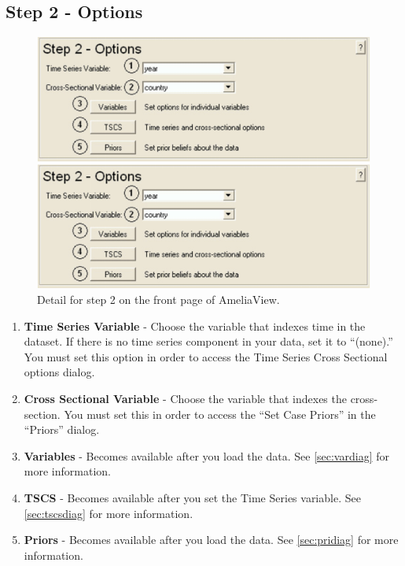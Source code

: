 \documentclass[12pt,titlepage]{article}
\begin{document}
\subsection{Step 2 - Options}

\label{sec:step2}
\begin{figure}[ht]
 \begin{htmlonly} 
  \centering \includegraphics[scale=1]{step2} 
 \end{htmlonly}
 \begin{latexonly}
  \centering \includegraphics[scale=.75]{step2}
 \end{latexonly}
  \caption{Detail for step 2 on the front page of AmeliaView.}
\end{figure}
\begin{enumerate}
\item \textbf{Time Series Variable} - Choose the variable that indexes
  time in the dataset.  If there is no time series component in your
  data, set it to ``(none).''  You must set this option in order to
  access the Time Series Cross Sectional options dialog.
\item \textbf{Cross Sectional Variable} - Choose the variable that
  indexes the cross-section.  You must set this in order to access the
  ``Set Case Priors'' in the ``Priors'' dialog.
\item \textbf{Variables} - Becomes available after you load the data.
  See \ref{sec:vardiag} for more information.
\item \textbf{TSCS} - Becomes available after you set the Time Series
  variable.  See \ref{sec:tscsdiag} for more information.
\item \textbf{Priors} - Becomes available after you load the data.
  See \ref{sec:pridiag} for more information.
\end{enumerate}
\end{document}
